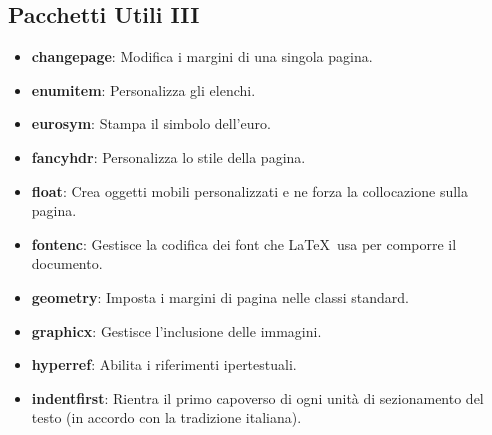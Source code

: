 \documentclass{report}
\begin{document}
            \subsection{Pacchetti Utili III}
                \begin{itemize}
                    \item \textbf{changepage}: Modifica i margini di una singola pagina.
                    \item \textbf{enumitem}: Personalizza gli elenchi.
                    \item \textbf{eurosym}: Stampa il simbolo dell'euro.
                    \item \textbf{fancyhdr}: Personalizza lo stile della pagina.
                    \item \textbf{float}: Crea oggetti mobili personalizzati e ne forza la collocazione sulla pagina.
                    \item \textbf{fontenc}: Gestisce la codifica dei font che \LaTeX\ usa per comporre il documento.
                    \item \textbf{geometry}: Imposta i margini di pagina nelle classi standard.
                    \item \textbf{graphicx}: Gestisce l'inclusione delle immagini.
                    \item \textbf{hyperref}: Abilita i riferimenti ipertestuali.
                    \item \textbf{indentfirst}: Rientra il primo capoverso di ogni unità di sezionamento del testo (in accordo con la tradizione italiana).
                \end{itemize}
\end{document}

